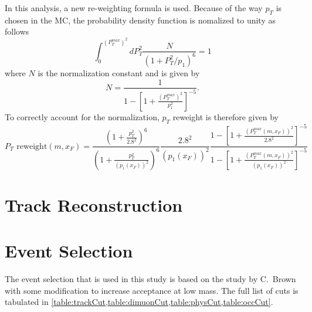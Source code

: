 \documentclass[../main.tex]{subfiles}
\begin{document}
In this analysis, a new re-weighting formula is used. Because of the way $p_T$ is chosen
in the MC, the probability density function is nomalized to unity as follows
\begin{equation}
	\int^{\left(P_T^{max}\right)^2}_0 dP_T^2 \frac{N}{\left(1+ P_T^2/p_1\right)^6}=1
\end{equation}
where $N$ is the normalization constant and is given by
\begin{equation}
	N=\frac{1}{1-\left[ 1+ \frac{\left(P_T^{max}\right)^2}{p_1^2}\right]^{-5}}.
\end{equation}
To correctly account for the normalization, $p_T$ reweight is therefore given by 
\begin{equation}
    P_T \textrm{ reweight}\left(m,x_F\right)=
      \frac{\left(1 + \frac{p_T^2}{2.8^2} \right)^6}{\left(1 + \frac{p_T^2}{\left(p_1\left(x_F\right)\right)^2} \right)^6} \frac{2.8^2}{\left(p_1\left(x_F\right)\right)^2}\frac{1-\left[ 1+ \frac{\left(P_T^{max}\left(m,x_F\right)\right)^2}{2.8^2}\right]^{-5}}{1-\left[ 1+ \frac{\left(P_T^{max}\left(m,x_F\right)\right)^2}{\left(p_1\left(x_F\right)\right)^2}\right]^{-5}}
\end{equation}


\section{Track Reconstruction}

\section{Event Selection}
The event selection that is used in this study is based on the study by C.~Brown
\cite{chuck-2111} with some modification to increase acceptance at low mass. The
full list of cuts is tabulated in \cref{table:trackCut,table:dimuonCut,table:physCut,table:occCut}.
\end{document}
